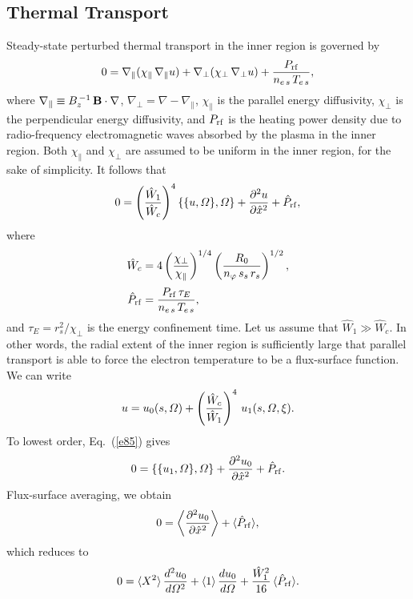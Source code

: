 \documentclass[12pt,prb,aps]{revtex4-1}
\begin{document}
\subsection{Thermal Transport}\label{sthermal}
Steady-state perturbed thermal transport in the inner region is
governed by\,\cite{plasma}
\begin{equation}
0 = \nabla_\parallel(\chi_\parallel\,\nabla_\parallel u)+ 
\nabla_\perp(\chi_\perp\,\nabla_\perp u) + \frac{P_{\rm rf}}{n_{e\,s}\,T_{e\,s}},
\end{equation}
where $\nabla_\parallel \equiv B_z^{\,-1}\,{\bf B}\cdot\nabla$,
$\nabla_\perp = \nabla - \nabla_\parallel$, $\chi_\parallel$ is the
parallel energy diffusivity, $\chi_\perp$ is the perpendicular
energy diffusivity, and $P_{\rm rf}$ is the heating power density due to radio-frequency electromagnetic waves absorbed by the plasma in the inner region. Both $\chi_\parallel$ and $\chi_\perp$ are assumed to be uniform in the inner region, for the sake of simplicity. 
It follows that
\begin{equation}\label{e85}
0 = \left(\frac{\hat{W}_1}{\hat{W}_c}\right)^4\{\{u,{\mit\Omega}\},{\mit\Omega}\} + \frac{\partial^2 u}{\partial\hat{x}^2}+\hat{P}_{\rm rf},
\end{equation}
where
\begin{align}
\hat{W}_c &= 4\left(\frac{\chi_\perp}{\chi_\parallel}\right)^{1/4}\left(\frac{R_0}{n_\varphi\,s_s\,r_s}\right)^{1/2},\\[0.5ex]
\hat{P}_{\rm rf} &= \frac{P_{\rm rf}\,\tau_E}{n_{e\,s}\,T_{e\,s}},
\end{align}
and $\tau_E=r_s^2/\chi_\perp$ is the energy confinement time. 
Let us assume that $\hat{W}_1\gg \hat{W}_c$. In other words, the
radial extent of the inner region is sufficiently large that parallel transport is able to force the electron temperature to be a flux-surface function.\cite{fitz}
We can write
\begin{equation}
u= u_0(s,{\mit\Omega})+\left(\frac{\hat{W}_c}{\hat{W}_1}\right)^4\,u_1(s,{\mit\Omega},\xi).
\end{equation}
To lowest order, Eq.~(\ref{e85}) gives
\begin{equation}
0 = \{\{u_1,{\mit\Omega}\},{\mit\Omega}\} + \frac{\partial^2 u_0}{\partial\hat{x}^2}+ \hat{P}_{\rm rf}.
\end{equation}
Flux-surface averaging, we obtain
\begin{equation}
0=\left\langle \frac{\partial^2 u_0}{\partial\hat{x}^2}
\right\rangle + \langle \hat{P}_{\rm rf}\rangle,
\end{equation}
which reduces to
\begin{equation}
0=\langle X^2\rangle \,\frac{d^2u_0}{d{\mit\Omega}^2} +\langle 1\rangle\,\frac{du_0}{d{\mit\Omega}} + \frac{\hat{W}_1^2}{16}\,\langle \hat{P}_{\rm rf}\rangle.
\end{equation}
\end{document}
